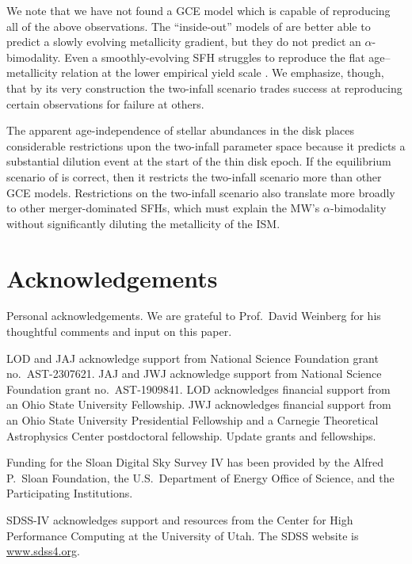 \documentclass[twocolumn,twocolappendix,linenumbers]{aastex631}
\newcommand{\todo}[1]{{\color{red}#1}}
\begin{document}
We note that we have not found a GCE model which is capable of reproducing all of the above observations. The ``inside-out'' models of \citet{johnson_stellar_2021} are better able to predict a slowly evolving metallicity gradient, but they do not predict an $\alpha$-bimodality. Even a smoothly-evolving SFH struggles to reproduce the flat age--metallicity relation at the lower empirical yield scale \citep{johnson_milky_2024}. We emphasize, though, that by its very construction the two-infall scenario trades success at reproducing certain observations for failure at others.

The apparent age-independence of stellar abundances in the disk places considerable restrictions upon the two-infall parameter space because it predicts a substantial dilution event at the start of the thin disk epoch. If the equilibrium scenario of \citet{johnson_milky_2024} is correct, then it restricts the two-infall scenario more than other GCE models. Restrictions on the two-infall scenario also translate more broadly to other merger-dominated SFHs, which must explain the MW's $\alpha$-bimodality without significantly diluting the metallicity of the ISM.

\section*{Acknowledgements}

\todo{Personal acknowledgements.} We are grateful to Prof.\ David Weinberg for his thoughtful comments and input on this paper.

LOD and JAJ acknowledge support from National Science Foundation grant no.\ AST-2307621. JAJ and JWJ acknowledge support from National Science Foundation grant no.\ AST-1909841.
LOD acknowledges financial support from an Ohio State University Fellowship.
JWJ acknowledges financial support from an Ohio State University Presidential Fellowship and a Carnegie Theoretical Astrophysics Center postdoctoral fellowship. \todo{Update grants and fellowships.}

Funding for the Sloan Digital Sky 
Survey IV has been provided by the 
Alfred P.\ Sloan Foundation, the U.S.\ 
Department of Energy Office of 
Science, and the Participating 
Institutions. 

SDSS-IV acknowledges support and 
resources from the Center for High 
Performance Computing  at the 
University of Utah. The SDSS 
website is \url{www.sdss4.org}.
\end{document}
